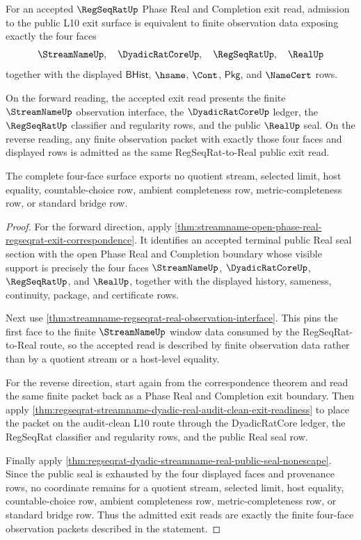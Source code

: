 \begin{theorem}
\label{thm:regseqrat-four-face-finite-observation-completeness}
For an accepted $\RegSeqRatUp$ Phase Real and Completion exit read, admission to
the public L10 exit surface is equivalent to finite observation data exposing
exactly the four faces
$$
\StreamNameUp,\quad \DyadicRatCoreUp,\quad \RegSeqRatUp,\quad \RealUp
$$
together with the displayed $\mathsf{BHist}$, $\hsame$, $\Cont$,
$\mathsf{Pkg}$, and $\NameCert$ rows.

On the forward reading, the accepted exit read presents the finite
$\StreamNameUp$ observation interface, the $\DyadicRatCoreUp$ ledger, the
$\RegSeqRatUp$ classifier and regularity rows, and the public $\RealUp$ seal.
On the reverse reading, any finite observation packet with exactly those four
faces and displayed rows is admitted as the same RegSeqRat-to-Real public exit
read.

The complete four-face surface exports no quotient stream, selected limit, host
equality, countable-choice row, ambient completeness row, metric-completeness
row, or standard bridge row.
\end{theorem}
\begin{proof}
For the forward direction, apply
\autoref{thm:streamname-open-phase-real-regseqrat-exit-correspondence}. It
identifies an accepted terminal public Real seal section with the open Phase
Real and Completion boundary whose visible support is precisely the four faces
$\StreamNameUp$, $\DyadicRatCoreUp$, $\RegSeqRatUp$, and $\RealUp$, together
with the displayed history, sameness, continuity, package, and certificate rows.

Next use \autoref{thm:streamname-regseqrat-real-observation-interface}. This
pins the first face to the finite $\StreamNameUp$ window data consumed by the
RegSeqRat-to-Real route, so the accepted read is described by finite
observation data rather than by a quotient stream or a host-level equality.

For the reverse direction, start again from the correspondence theorem and read
the same finite packet back as a Phase Real and Completion exit boundary. Then
apply
\autoref{thm:regseqrat-streamname-dyadic-real-audit-clean-exit-readiness} to
place the packet on the audit-clean L10 route through the DyadicRatCore ledger,
the RegSeqRat classifier and regularity rows, and the public Real seal row.

Finally apply
\autoref{thm:regseqrat-dyadic-streamname-real-public-seal-nonescape}. Since the
public seal is exhausted by the four displayed faces and provenance rows, no
coordinate remains for a quotient stream, selected limit, host equality,
countable-choice row, ambient completeness row, metric-completeness row, or
standard bridge row. Thus the admitted exit reads are exactly the finite
four-face observation packets described in the statement.
\end{proof}

